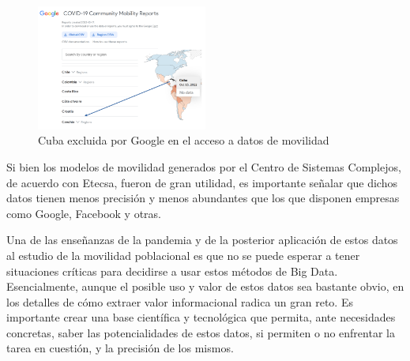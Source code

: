 \begin{figure}[!htb] \centering \includegraphics[width=0.5\textwidth]{Graphics/google_exclusion.pdf} \caption{Cuba excluida por Google en el acceso a datos de movilidad} \label{fig:google_exclusion} \end{figure}

Si bien los modelos de movilidad generados por el Centro de Sistemas Complejos, de acuerdo con Etecsa, fueron de gran utilidad, es importante señalar que dichos datos tienen menos precisión y menos abundantes que los que disponen empresas como Google, Facebook y otras.

Una de las enseñanzas de la pandemia y de la posterior aplicación de estos datos al estudio de la movilidad poblacional es que no se puede esperar a tener situaciones críticas para decidirse a usar estos métodos de Big Data. Esencialmente, aunque el posible uso y valor de estos datos sea bastante obvio, en los detalles de cómo extraer valor informacional radica un gran reto. Es importante crear una base científica y tecnológica que permita, ante necesidades concretas, saber las potencialidades de estos datos, si permiten o no enfrentar la tarea en cuestión, y la precisión de los mismos.


